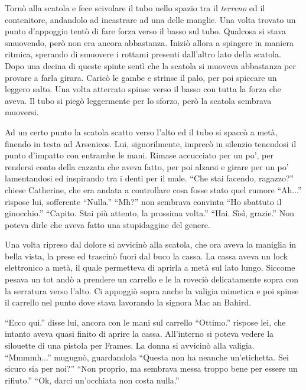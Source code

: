     Tornò alla scatola e fece scivolare il tubo nello spazio tra il \emph{terreno} ed il contenitore, andandolo ad
    incastrare ad una delle manglie. Una volta trovato un punto d'appoggio tentò di fare forza verso il basso sul tubo.
    Qualcosa si stava smuovendo, però non era ancora abbastanza. Iniziò allora a spingere in maniera ritmica, sperando
    di smuovere i rottami presenti dall'altro lato della scatola. Dopo una decina di queste spinte sentì che la scatola
    si muoveva abbastanza per provare a farla girara. Caricò le gambe e strinse il palo, per poi spiccare un leggero
    salto. Una volta atterrato spinse verso il basso con tutta la forza che aveva. Il tubo si piegò leggermente per lo
    sforzo, però la scatola sembrava muoversi.

    Ad un certo punto la scatola scatto verso l'alto ed il tubo si spaccò a metà, finendo in testa ad Arsenicos. Lui,
    signorilmente, imprecò in silenzio tenendosi il punto d'impatto con entrambe le mani. Rimase accucciato per un po',
    per rendersi conto della cazzata che aveva fatto, per poi alzarsi e girare per un po' lamentandosi ed inspirando tra
    i denti per il male. ``Che stai facendo, ragazzo?'' chiese Catherine, che era andata a controllare cosa fosse stato
    quel rumore ``Ah...'' rispose lui, sofferente ``Nulla.'' ``Mh?'' non sembrava convinta ``Ho sbattuto il ginocchio.''
    ``Capito. Stai più attento, la prossima volta.'' ``Hai. Sìsì, grazie.'' Non poteva dirle che aveva fatto una
    stupidaggine del genere.

    Una volta ripreso dal dolore si avvicinò alla scatola, che ora aveva la maniglia in bella vista, la prese ed
    trascinò fuori dal buco la cassa. La cassa aveva un lock elettronico a metà, il quale permetteva di aprirla a metà sul lato
    lungo. Siccome pesava un tot andò a prendere un carrello e le la roveciò delicatamente sopra con la serratura verso
    l'alto. Ci appoggiò sopra anche la valigia mimetica e poi spinse il carrello nel punto dove stava lavorando la
    signora Mac an Bahird.

    ``Ecco quì.'' disse lui, ancora con le mani sul carrello ``Ottimo.'' rispose lei, che intanto aveva quasi finito di
    aprire la cassa. All'interno si poteva vedere la silouette di una pistola per Frames. La donna si avvicinò alla
    valigia. ``Mmmmh...'' mugugnò, guardandola ``Questa non ha neanche un'etichetta. Sei sicuro sia per noi?'' ``Non
    proprio, ma sembrava messa troppo bene per essere un rifiuto.'' ``Ok, darci un'occhiata non costa nulla.''

